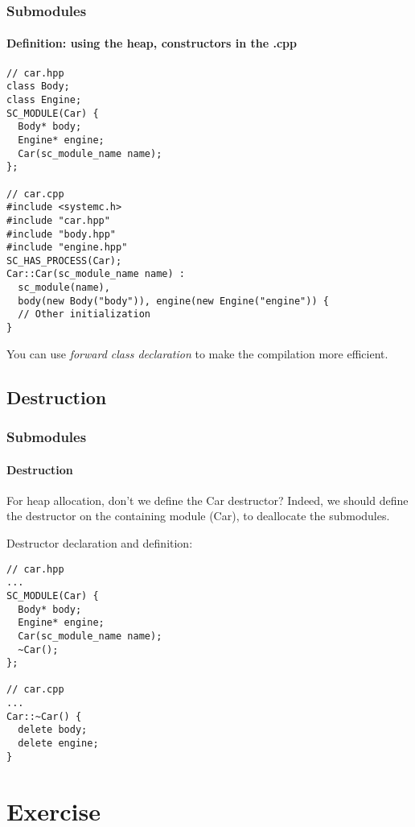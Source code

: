 \begin{frame}[fragile]
\frametitle{Submodules}
\framesubtitle{Definition: using the heap, constructors in the .cpp}

{\scriptsize
\vspace{-0.5em}
\begin{verbatim}
// car.hpp
class Body;
class Engine;
SC_MODULE(Car) {
  Body* body;
  Engine* engine;
  Car(sc_module_name name);
};

// car.cpp
#include <systemc.h>
#include "car.hpp"
#include "body.hpp"
#include "engine.hpp"
SC_HAS_PROCESS(Car);
Car::Car(sc_module_name name) : 
  sc_module(name), 
  body(new Body("body")), engine(new Engine("engine")) {
  // Other initialization
}
\end{verbatim}
You can use {\em forward class declaration} to make the compilation more efficient.
}
\end{frame}

\subsection{Destruction}

\begin{frame}[fragile]
\frametitle{Submodules}
\framesubtitle{Destruction}

{\scriptsize
\begin{block}{{\small For heap allocation, don't we define the Car destructor?}}
Indeed, we should define the destructor on the containing module (Car), to deallocate the submodules.
\end{block}
\pause
\begin{block}{{\small Destructor declaration and definition:}}
\vspace{-1em}
\begin{verbatim}
// car.hpp
...
SC_MODULE(Car) {
  Body* body;
  Engine* engine;
  Car(sc_module_name name);
  ~Car();
};

// car.cpp
...
Car::~Car() {
  delete body;
  delete engine;
}
\end{verbatim}
\vspace{-1em}
\end{block}
}
\end{frame}

\section{Exercise}

